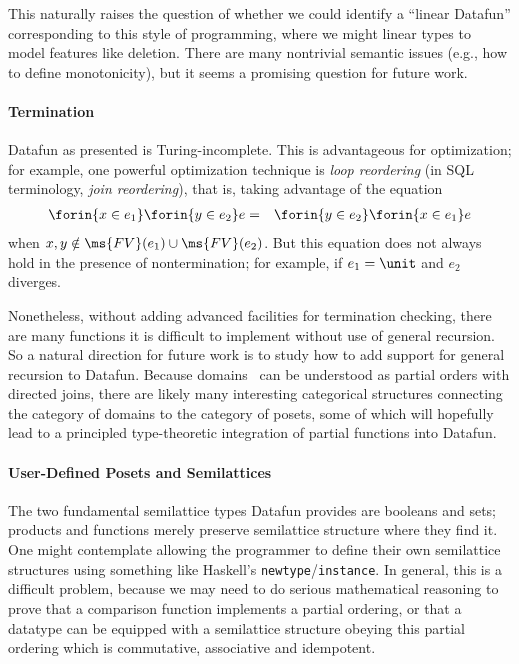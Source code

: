 This naturally raises the question of whether we could identify a
``linear Datafun'' corresponding to this style of programming, where
we might linear types to model features like deletion. There are many
nontrivial semantic issues (e.g., how to define monotonicity), but
it seems a promising question for future work.

\paragraph{Termination}

Datafun as presented is Turing-incomplete. This is advantageous for
optimization; for example, one powerful optimization technique is \emph{loop
  reordering} (in SQL terminology, \emph{join reordering}), that is, taking
advantage of the equation
\begin{eqnarray*}
  \forin{x \in e_1} \forin{y \in e_2} e
  &=& \forin{y \in e_2} \forin{x \in e_1} e
\end{eqnarray*}
when $x,y \notin \ms{FV}(e_1) \cup \ms{FV}(e_2)$. But this equation does not
always hold in the presence of nontermination; for example, if $e_1 = \unit$ and
$e_2$ diverges.

Nonetheless, without adding advanced facilities for termination
checking, there are many functions it is difficult to implement
without use of general recursion. So a natural direction for future
work is to study how to add support for general recursion to Datafun.
Because domains~\cite{domain-theory} can be understood as partial
orders with directed joins, there are likely many interesting
categorical structures connecting the category of domains to the
category of posets, some of which will hopefully lead to a principled
type-theoretic integration of partial functions into Datafun.

\paragraph{User-Defined Posets and Semilattices}
The two fundamental semilattice types Datafun provides are booleans and sets;
products and functions merely preserve semilattice structure where they find it.
One might contemplate allowing the programmer to define their own semilattice
structures using something like Haskell's \texttt{newtype}/\texttt{instance}. In
general, this is a difficult problem, because we may need to do serious
mathematical reasoning to prove that a comparison function implements a partial
ordering, or that a datatype can be equipped with a semilattice structure
obeying this partial ordering which is commutative, associative and idempotent.

